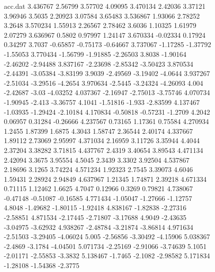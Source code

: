 \begin{figure}[H]
\begin{filecontents}{acc.dat}
                3.436767	2.56799	3.57702	4.09095
                3.470134	2.42036	3.37121	3.96946
                3.5035	2.20923	3.07584	3.65483
                3.536867	1.93066	2.78252	3.2648
                3.570234	1.55913	2.26567	2.78462
                3.6036	1.10325	1.61979	2.07279
                3.636967	0.5802	0.97997	1.24147
                3.670334	-0.02334	0.17924	0.34297
                3.7037	-0.65857	-0.75173	-0.64667
                3.737067	-1.17285	-1.37792	-1.55053
                3.770434	-1.56799	-1.91885	-2.26503
                3.8038	-1.90164	-2.46202	-2.94488
                3.837167	-2.23698	-2.85342	-3.50423
                3.870534	-2.44391	-3.05384	-3.83199
                3.9039	-2.49569	-3.19402	-4.0644
                3.937267	-2.51034	-3.29516	-4.2654
                3.970634	-2.5445	-3.24324	-4.26093
                4.004	-2.42687	-3.03	-4.03252
                4.037367	-2.16947	-2.75013	-3.75746
                4.070734	-1.90945	-2.413	-3.36757
                4.1041	-1.51816	-1.933	-2.83599
                4.137467	-1.03935	-1.29424	-2.10184
                4.170834	-0.50818	-0.57231	-1.2709
                4.2042	0.06957	0.31284	-0.26666
                4.237567	0.73165	1.17361	0.75584
                4.270934	1.2455	1.87399	1.6875
                4.3043	1.58747	2.36544	2.40174
                4.337667	1.89112	2.73069	2.95997
                4.371034	2.16959	3.11726	3.35944
                4.4044	2.37204	3.38282	3.71815
                4.437767	2.4319	3.40654	3.89543
                4.471134	2.42094	3.3675	3.95554
                4.5045	2.3439	3.3302	3.92504
                4.537867	2.18696	3.1265	3.74224
                4.571234	1.92323	2.7545	3.39073
                4.6046	1.59431	2.28924	2.94849
                4.637967	1.21345	1.74871	2.39218
                4.671334	0.71115	1.12462	1.6625
                4.7047	0.12966	0.3269	0.79821
                4.738067	-0.47148	-0.51087	-0.16585
                4.771434	-1.05047	-1.27666	-1.12757
                4.8048	-1.49682	-1.80115	-1.92418
                4.838167	-1.82838	-2.27316	-2.58851
                4.871534	-2.17445	-2.71807	-3.17688
                4.9049	-2.43635	-3.04975	-3.62932
                4.938267	-2.48784	-3.21874	-3.86814
                4.971634	-2.51503	-3.29405	-4.06024
                5.005	-2.56856	-3.30492	-4.15906
                5.038367	-2.4869	-3.1784	-4.04501
                5.071734	-2.25169	-2.91066	-3.74639
                5.1051	-2.01171	-2.55853	-3.3832
                5.138467	-1.7465	-2.1082	-2.98582
                5.171834	-1.28108	-1.54368	-2.3775

\end{filecontents}
\end{figure}
